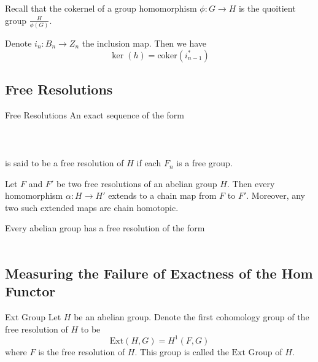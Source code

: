 \documentclass[a4paper]{article}
\begin{document}
Recall that the cokernel of a group homomorphism $\phi:G\to H$ is the quoitient group $\frac{H}{\phi(G)}$. 

\begin{lmm}{}{} Denote $i_n:B_n\to Z_n$ the inclusion map. Then we have $$\ker(h)=\text{coker}(i_{n-1}^\ast)$$
\end{lmm}

\subsection{Free Resolutions}
\begin{defn}{Free Resolutions}{} An exact sequence of the form \\~\\
\\~\\
is said to be a free resolution of $H$ if each $F_n$ is a free group. 
\end{defn}

\begin{prp}{}{} Let $F$ and $F'$ be two free resolutions of an abelian group $H$. Then every homomorphism $\alpha:H\to H'$ extends to a chain map from $F$ to $F'$. Moreover, any two such extended maps are chain homotopic. 
\end{prp}

\begin{lmm}{}{} Every abelian group has a free resolution of the form \\~\\
\end{lmm}

\subsection{Measuring the Failure of Exactness of the Hom Functor}
\begin{defn}{Ext Group}{} Let $H$ be an abelian group. Denote the first cohomology group of the free resolution of $H$ to be $$\text{Ext}(H,G)=H^1(F,G)$$ where $F$ is the free resolution of $H$. This group is called the $\text{Ext}$ Group of $H$. 
\end{defn}
\end{document}
